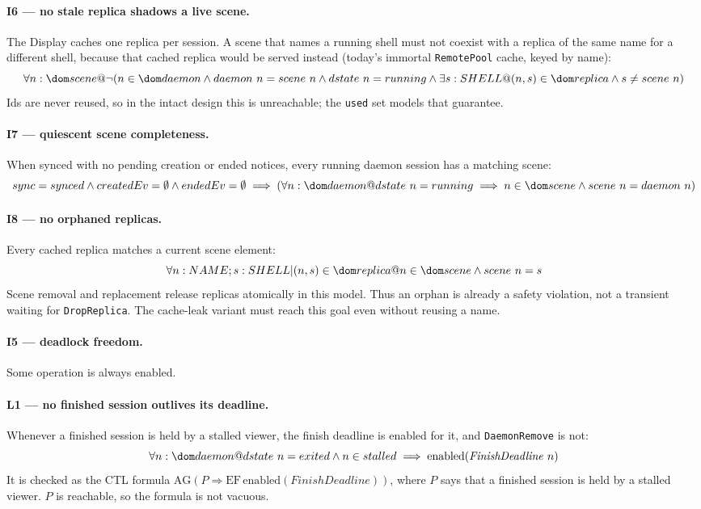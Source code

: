 \documentclass[a4paper,10pt,fleqn]{article}
\begin{document}
\paragraph{I6 --- no stale replica shadows a live scene.}
The Display caches one replica per session.  A scene that names a running
shell must not coexist with a replica of the same name for a different
shell, because that cached replica would be served instead (today's
immortal \texttt{RemotePool} cache, keyed by name):
\[
  \forall n : \dom scene @ \lnot (n \in \dom daemon \land
    daemon~n = scene~n \land dstate~n = running \land
    \exists s : SHELL @ (n , s) \in \dom replica \land s \neq scene~n)
\]
Ids are never reused, so in the intact design this is unreachable; the
\texttt{used} set models that guarantee.

\paragraph{I7 --- quiescent scene completeness.}
When synced with no pending creation or ended notices, every running daemon
session has a matching scene:
\[
  sync = synced \land createdEv = \emptyset \land endedEv = \emptyset
  \implies (\forall n : \dom daemon @ dstate~n = running \implies
    n \in \dom scene \land scene~n = daemon~n)
\]

\paragraph{I8 --- no orphaned replicas.}
Every cached replica matches a current scene element:
\[
  \forall n : NAME; s : SHELL | (n , s) \in \dom replica @
    n \in \dom scene \land scene~n = s
\]
Scene removal and replacement release replicas atomically in this model.
Thus an orphan is already a safety violation, not a transient waiting for
\texttt{DropReplica}. The cache-leak variant must reach this goal even
without reusing a name.

\paragraph{I5 --- deadlock freedom.}
Some operation is always enabled.

\paragraph{L1 --- no finished session outlives its deadline.}
Whenever a finished session is held by a stalled viewer, the finish deadline
is enabled for it, and \texttt{DaemonRemove} is not:
\[
  \forall n : \dom daemon @ dstate~n = exited \land n \in stalled
    \implies \mathrm{enabled}(\mathit{FinishDeadline}~n)
\]
It is checked as the CTL formula $\mathrm{AG}(P \Rightarrow
\mathrm{EF}\,\mathrm{enabled}(\mathit{FinishDeadline}))$, where $P$ says that
a finished session is held by a stalled viewer.  $P$ is reachable, so the
formula is not vacuous.
\end{document}
